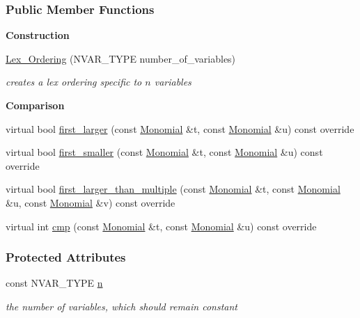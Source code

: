 \subsubsection*{Public Member Functions}
\begin{Indent}\textbf{ Construction}\par
\begin{DoxyCompactItemize}
\item 
\hyperlink{group__orderinggroup_a35968aecc4009c0d15bfd357ccf74a5f}{Lex\+\_\+\+Ordering} (N\+V\+A\+R\+\_\+\+T\+Y\+PE number\+\_\+of\+\_\+variables)
\begin{DoxyCompactList}\small\item\em creates a lex ordering specific to $n$ variables \end{DoxyCompactList}\end{DoxyCompactItemize}
\end{Indent}
\begin{Indent}\textbf{ Comparison}\par
\begin{DoxyCompactItemize}
\item 
virtual bool \hyperlink{group__orderinggroup_acf085490051fdbbdde6e89831e3f0eda}{first\+\_\+larger} (const \hyperlink{group__polygroup_class_monomial}{Monomial} \&t, const \hyperlink{group__polygroup_class_monomial}{Monomial} \&u) const override
\item 
virtual bool \hyperlink{group__orderinggroup_ae42ea2c7b8fa45bcb46e56480d5f8abb}{first\+\_\+smaller} (const \hyperlink{group__polygroup_class_monomial}{Monomial} \&t, const \hyperlink{group__polygroup_class_monomial}{Monomial} \&u) const override
\item 
virtual bool \hyperlink{group__orderinggroup_a3ed34485d01b60236bc2ed70e05ed06a}{first\+\_\+larger\+\_\+than\+\_\+multiple} (const \hyperlink{group__polygroup_class_monomial}{Monomial} \&t, const \hyperlink{group__polygroup_class_monomial}{Monomial} \&u, const \hyperlink{group__polygroup_class_monomial}{Monomial} \&v) const override
\item 
virtual int \hyperlink{group__orderinggroup_a44d74f3b1e29abde22334f455979a67f}{cmp} (const \hyperlink{group__polygroup_class_monomial}{Monomial} \&t, const \hyperlink{group__polygroup_class_monomial}{Monomial} \&u) const override
\end{DoxyCompactItemize}
\end{Indent}
\subsubsection*{Protected Attributes}
\begin{DoxyCompactItemize}
\item 
\mbox{\label{group__orderinggroup_a5065dfa6430e7fef522edbf762841ab7}} 
const N\+V\+A\+R\+\_\+\+T\+Y\+PE \hyperlink{group__orderinggroup_a5065dfa6430e7fef522edbf762841ab7}{n}
\begin{DoxyCompactList}\small\item\em the number of variables, which should remain constant \end{DoxyCompactList}\end{DoxyCompactItemize}


